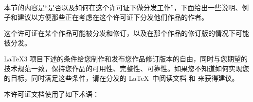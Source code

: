\begin{LPPLicense}

    本节的内容是``是否以及如何在这个许可证下做分发工作''，下面给出一些说明、例子和建议以方便那些正在考虑在这个许可证下分发他们作品的作者。


    这个许可证在某个作品可能被分发和修订，以及在那个作品的修订版的情况下可能被分发。


    \LaTeX3 项目下述的条件给您制作和发布您作品修订版本的自由，同时与您期望的技术规范一致，保持您作品的可用性、完整性、可靠性。如果您不知道如何实现您的目标，同时满足这些条件，请在分发的 \LaTeX\ 中阅读文档  和  来获得建议。


    \label{LPPL:Definitions}


    本许可证文档使用了如下术语：


\end{LPPLicense}
